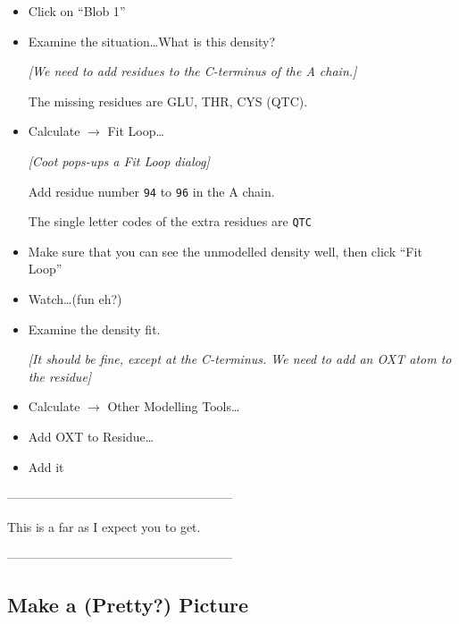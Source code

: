 \documentclass{article}
\begin{document}
\begin{itemize}
\item Click on ``\textsf{Blob 1}''

\item Examine the situation\ldots  What is this density?

  \emph{[We need to add residues to the C-terminus of the A chain.]}

The missing residues are GLU, THR, CYS (QTC).

\item \textsf{Calculate $\rightarrow$ Fit Loop\ldots}

\textsl{ [Coot pops-ups a Fit Loop dialog]}

Add residue number \texttt{94} to \texttt{96} in the A chain.

The single letter codes of the extra residues are \texttt{QTC}

\item Make sure that you can see the unmodelled density well, then click \textsf{``Fit Loop''}

\item Watch\ldots (fun eh?)

\item Examine the density fit. 
  
  \textsl{ [It should be fine, except at the C-terminus.  We need to
    add an OXT atom to the residue]}

\item \textsf{Calculate $\rightarrow$ Other Modelling Tools\ldots}

\item \textsf{Add OXT to Residue\ldots}

\item \textsf{Add it}

\end{itemize}



\begin{center}
------------------------------------------------------

This is a far as I expect you to get.

------------------------------------------------------
\end{center}

\subsection{Make a (Pretty?) Picture}
\end{document}
